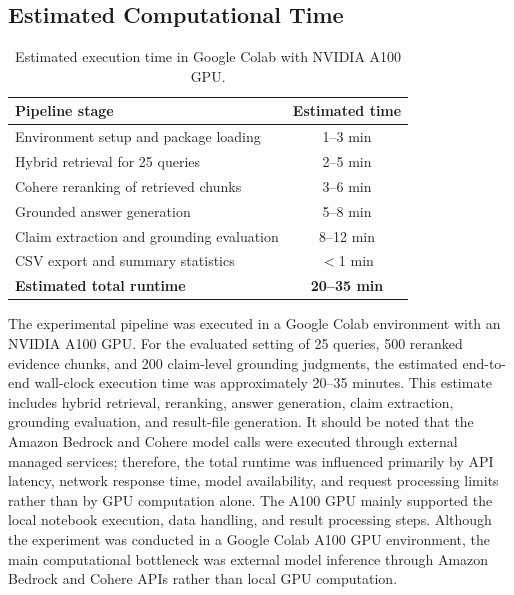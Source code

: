 \subsection{Estimated Computational Time}

\begin{table}[!t]
\centering
\caption{Estimated execution time in Google Colab with NVIDIA A100 GPU.}
\label{tab:estimated_runtime}
\begin{tabular}{lc}
\hline
\textbf{Pipeline stage} & \textbf{Estimated time} \\
\hline
Environment setup and package loading & 1--3 min \\
Hybrid retrieval for 25 queries & 2--5 min \\
Cohere reranking of retrieved chunks & 3--6 min \\
Grounded answer generation & 5--8 min \\
Claim extraction and grounding evaluation & 8--12 min \\
CSV export and summary statistics & $<$1 min \\
\hline
\textbf{Estimated total runtime} & \textbf{20--35 min} \\
\hline
\end{tabular}
\end{table}

The experimental pipeline was executed in a Google Colab environment with an NVIDIA A100 GPU. For the evaluated setting of 25 queries, 500 reranked evidence chunks, and 200 claim-level grounding judgments, the estimated end-to-end wall-clock execution time was approximately 20--35 minutes. This estimate includes hybrid retrieval, reranking, answer generation, claim extraction, grounding evaluation, and result-file generation. It should be noted that the Amazon Bedrock and Cohere model calls were executed through external managed services; therefore, the total runtime was influenced primarily by API latency, network response time, model availability, and request processing limits rather than by GPU computation alone. The A100 GPU mainly supported the local notebook execution, data handling, and result processing steps. Although the experiment was conducted in a Google Colab A100 GPU environment, the main computational bottleneck was external model inference through Amazon Bedrock and Cohere APIs rather than local GPU computation.



